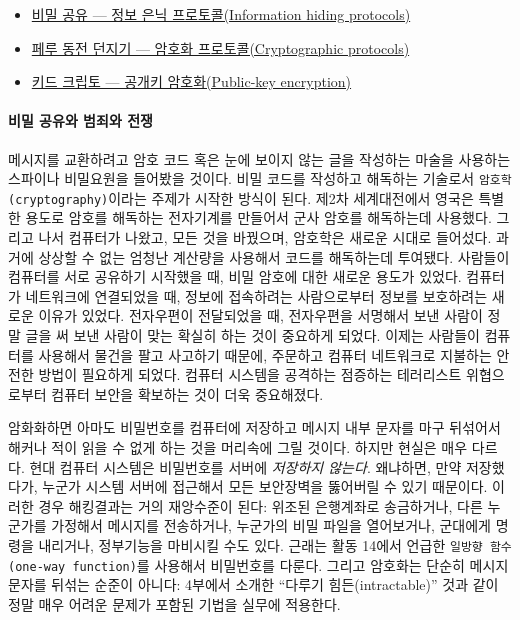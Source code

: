 \documentclass[]{article}
\begin{document}
\begin{itemize}
\itemsep1pt\parskip0pt
\item
  \href{csunplugged/05-part/17-info-hiding.html}{비밀 공유 --- 정보 은닉
  프로토콜(Information hiding protocols)}
\item
  \href{csunplugged/05-part/18-crypto.html}{페루 동전 던지기 --- 암호화
  프로토콜(Cryptographic protocols)}
\item
  \href{csunplugged/05-part/19-public-key.html}{키드 크립토 --- 공개키
  암호화(Public-key encryption)}
\end{itemize}

\mbox{}\paragraph{비밀 공유와 범죄와 전쟁}\label{section-222}

메시지를 교환하려고 암호 코드 혹은 눈에 보이지 않는 글을 작성하는 마술을
사용하는 스파이나 비밀요원을 들어봤을 것이다. 비밀 코드를 작성하고
해독하는 기술로서 \texttt{암호학(cryptography)}이라는 주제가 시작한
방식이 된다. 제2차 세계대전에서 영국은 특별한 용도로 암호를 해독하는
전자기계를 만들어서 군사 암호를 해독하는데 사용했다. 그리고 나서
컴퓨터가 나왔고, 모든 것을 바꿨으며, 암호학은 새로운 시대로 들어섰다.
과거에 상상할 수 없는 엄청난 계산량을 사용해서 코드를 해독하는데
투여됐다. 사람들이 컴퓨터를 서로 공유하기 시작했을 때, 비밀 암호에 대한
새로운 용도가 있었다. 컴퓨터가 네트워크에 연결되었을 때, 정보에
접속하려는 사람으로부터 정보를 보호하려는 새로운 이유가 있었다.
전자우편이 전달되었을 때, 전자우편을 서명해서 보낸 사람이 정말 글을 써
보낸 사람이 맞는 확실히 하는 것이 중요하게 되었다. 이제는 사람들이
컴퓨터를 사용해서 물건을 팔고 사고하기 때문에, 주문하고 컴퓨터
네트워크로 지불하는 안전한 방법이 필요하게 되었다. 컴퓨터 시스템을
공격하는 점증하는 테러리스트 위협으로부터 컴퓨터 보안을 확보하는 것이
더욱 중요해졌다.

암화화하면 아마도 비밀번호를 컴퓨터에 저장하고 메시지 내부 문자를 마구
뒤섞어서 해커나 적이 읽을 수 없게 하는 것을 머리속에 그릴 것이다. 하지만
현실은 매우 다르다. 현대 컴퓨터 시스템은 비밀번호를 서버에
\emph{저장하지 않는다}. 왜냐하면, 만약 저장했다가, 누군가 시스템 서버에
접근해서 모든 보안장벽을 뚫어버릴 수 있기 때문이다. 이러한 경우
해킹결과는 거의 재앙수준이 된다: 위조된 은행계좌로 송금하거나, 다른
누군가를 가정해서 메시지를 전송하거나, 누군가의 비밀 파일을 열어보거나,
군대에게 명령을 내리거나, 정부기능을 마비시킬 수도 있다. 근래는 활동
14에서 언급한 \texttt{일방향 함수(one-way function)}를 사용해서
비밀번호를 다룬다. 그리고 암호화는 단순히 메시지 문자를 뒤섞는 순준이
아니다: 4부에서 소개한 ``다루기 힘든(intractable)'' 것과 같이 정말 매우
어려운 문제가 포함된 기법을 실무에 적용한다.
\end{document}
